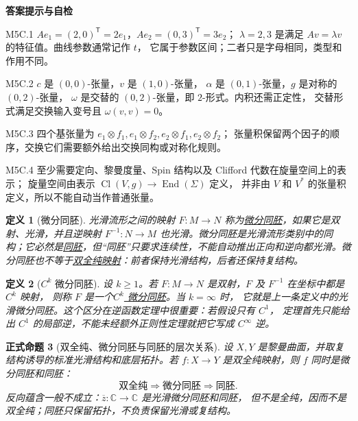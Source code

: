 \documentclass[UTF8,fontset=none,a4paper,11pt]{ctexart}
\theoremstyle{foundation-definition}
\newtheorem{definition}{定义}[section]
\theoremstyle{foundation-theorem}
\theoremstyle{foundation-proposition}
\newtheorem{proposition}[definition]{正式命题}
\theoremstyle{foundation-example}
\theoremstyle{foundation-remark}
\theoremstyle{foundation-theorem}
\newcommand{\term}[2]{\hyperref[#1]{#2}}
\newenvironment{answerkey}{%
\begin{mdframed}[backgroundcolor=examplebg,linecolor=examplepurple,linewidth=1.0pt,
  leftline=true,rightline=false,topline=false,bottomline=false,
  skipabove=7pt,skipbelow=8pt,innerleftmargin=10pt,innerrightmargin=8pt,
  innertopmargin=6pt,innerbottommargin=6pt]
{\sffamily\bfseries\color{examplepurple}答案提示与自检}\par\smallskip\small
}{\end{mdframed}}
\begin{document}
\begin{answerkey}
M5C.1 \(Ae_1=(2,0)^{\mathsf T}=2e_1\)，\(Ae_2=(0,3)^{\mathsf T}=3e_2\)；
\(\lambda=2,3\) 是满足 \(Av=\lambda v\) 的特征值。曲线参数通常记作 \(t\)，
它属于参数区间；二者只是字母相同，类型和作用不同。\par
M5C.2 \(c\) 是 \((0,0)\)-张量，\(v\) 是 \((1,0)\)-张量，
\(\alpha\) 是 \((0,1)\)-张量，\(g\) 是对称的 \((0,2)\)-张量，
\(\omega\) 是交替的 \((0,2)\)-张量，即 \(2\)-形式。内积还需正定性，
交替形式满足交换输入变号且 \(\omega(v,v)=0\)。\par
M5C.3 四个基张量为
\(e_1\otimes f_1,e_1\otimes f_2,e_2\otimes f_1,e_2\otimes f_2\)；
张量积保留两个因子的顺序，交换它们需要额外给出交换同构或对称化规则。\par
M5C.4 至少需要定向、黎曼度量、Spin 结构以及 Clifford 代数在旋量空间上的表示；
旋量空间由表示 \(\operatorname{Cl}(V,g)\to\operatorname{End}(\Sigma)\) 定义，
并非由 \(V\) 和 \(V^*\) 的张量积定义，所以不能自动当作普通张量。
\end{answerkey}

\begin{definition}[微分同胚]\label{def:diffeomorphism}
光滑流形之间的映射 \(F:M\to N\) 称为\term{def:diffeomorphism}{微分同胚}，如果它是双射、光滑，并且逆映射 \(F^{-1}:N\to M\) 也光滑。微分同胚是光滑流形类别中的同构；它必然是\term{def:homeomorphism}{同胚}，但“同胚”只要求连续性，不能自动推出正向和逆向都光滑。微分同胚也不等于\term{def:biholomorphic}{双全纯映射}：前者保持光滑结构，后者还保持复结构。
\end{definition}

\begin{definition}[\(C^k\) 微分同胚]\label{def:ck-diffeomorphism}
设 \(k\geq1\)。若 \(F:M\to N\) 是双射，\(F\) 及 \(F^{-1}\) 在坐标中都是 \(C^k\) 映射，
则称 \(F\) 是一个\term{def:ck-diffeomorphism}{\(C^k\) 微分同胚}。当 \(k=\infty\) 时，
它就是上一条定义中的光滑微分同胚。这个区分在逆函数定理中很重要：若假设只有 \(C^1\)，
定理首先只能给出 \(C^1\) 的局部逆，不能未经额外正则性定理就把它写成 \(C^\infty\) 逆。
\end{definition}

\begin{proposition}[双全纯、微分同胚与同胚的层次关系]\label{prop:biholo-diffeo-homeo}
设 \(X,Y\) 是黎曼曲面，并取复结构诱导的标准光滑结构和底层拓扑。若
\(f:X\to Y\) 是双全纯映射，则 \(f\) 同时是微分同胚和同胚：
\[
\text{双全纯}\Longrightarrow\text{微分同胚}\Longrightarrow\text{同胚}.
\]
反向蕴含一般不成立：\(\overline z:\mathbb C\to\mathbb C\) 是光滑微分同胚和同胚，
但不是全纯，因而不是双全纯；同胚只保留拓扑，不负责保留光滑或复结构。
\end{proposition}
\end{document}
